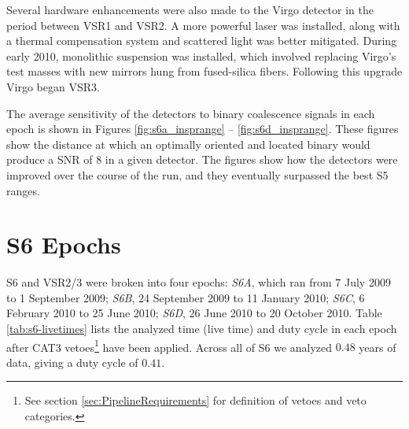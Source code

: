 Several hardware enhancements were also made to the Virgo detector in the
period between \ac{VSR1} and \ac{VSR2}. A more powerful laser was installed,
along with a thermal compensation system and scattered light was better
mitigated. During early 2010, monolithic suspension was installed, which
involved replacing Virgo's test masses with new mirrors hung from fused-silica
fibers. Following this upgrade Virgo began \ac{VSR3}. 

The average sensitivity of the detectors to binary coalescence signals in each
epoch is shown in Figures \ref{fig:s6a_insprange} -- \ref{fig:s6d_insprange}.
These figures show the distance at which an optimally oriented and located
binary would produce a \ac{SNR} of $8$ in a given detector. The figures show
how the detectors were improved over the course of the run, and they eventually
surpassed the best \ac{S5} ranges. 

\section{S6 Epochs}
\label{sec:s6_epochs}

\ac{S6} and VSR2/3 were broken into four epochs: \emph{S6A}, which ran from 7
July 2009 to 1 September 2009; \emph{S6B}, 24 September 2009 to 11 January
2010; \emph{S6C}, 6 February 2010 to 25 June 2010; \emph{S6D}, 26 June 2010 to
20 October 2010. Table \ref{tab:s6-livetimes} lists the analyzed time (live
time) and duty cycle in each epoch after CAT3 vetoes\footnote{See section
\ref{sec:PipelineRequirements} for definition of vetoes and veto categories.}
have been applied. Across all of S6 we analyzed $0.48$ years of data, giving a
duty cycle of $0.41$.

